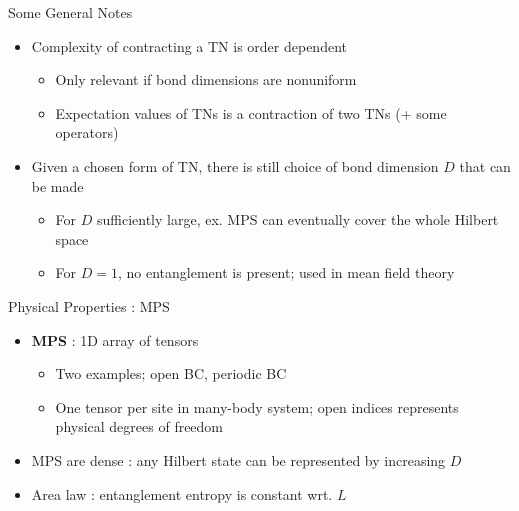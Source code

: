 \documentclass{beamer}
\begin{document}
\begin{frame}{Some General Notes}
	\begin{itemize}
	\item Complexity of contracting a TN is order dependent
		\begin{itemize}
		\item Only relevant if bond dimensions are nonuniform
		\item Expectation values of TNs is a contraction of two TNs (+ some operators)
		\end{itemize}
	\item Given a chosen form of TN, there is still choice of bond dimension ${ D }$ that can be made
		\begin{itemize}
		\item For ${ D }$ sufficiently large, ex. MPS can eventually cover the whole Hilbert space
		\item For ${ D =1}$, no entanglement is present; used in mean field theory
		\end{itemize}
	\end{itemize}
\end{frame}

\begin{frame}{Physical Properties : MPS}
	\begin{itemize}
		\item \textbf{MPS} : 1D array of tensors
		\begin{itemize}
		\item Two examples; open BC, periodic BC
		\item One tensor per site in many-body system; open indices represents physical degrees of freedom
		\end{itemize}
	\item MPS are dense : any Hilbert state can be represented by increasing ${ D }$
	\item Area law : entanglement entropy is constant wrt. ${ L }$
	\end{itemize}
\end{frame}
\end{document}
